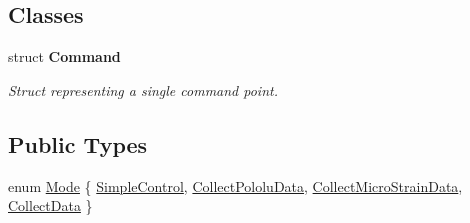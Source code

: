 \subsection*{\-Classes}
\begin{DoxyCompactItemize}
\item 
struct {\bfseries \-Command}
\begin{DoxyCompactList}\small\item\em \-Struct representing a single command point. \end{DoxyCompactList}\end{DoxyCompactItemize}
\subsection*{\-Public \-Types}
\begin{DoxyCompactItemize}
\item 
enum \hyperlink{class_u_s_u_1_1_kalman_filter_ab42b5998c23e20c32775873af96ce8c8}{\-Mode} \{ \hyperlink{class_u_s_u_1_1_kalman_filter_ab42b5998c23e20c32775873af96ce8c8abf30e92c798cd7c2a677f0dff63f8ea7}{\-Simple\-Control}, 
\hyperlink{class_u_s_u_1_1_kalman_filter_ab42b5998c23e20c32775873af96ce8c8ae435c722d55e7dda8c82b0b5ce18f136}{\-Collect\-Pololu\-Data}, 
\hyperlink{class_u_s_u_1_1_kalman_filter_ab42b5998c23e20c32775873af96ce8c8ae0a390c1eda0d057ba99b763bd863970}{\-Collect\-Micro\-Strain\-Data}, 
\hyperlink{class_u_s_u_1_1_kalman_filter_ab42b5998c23e20c32775873af96ce8c8a9d4c5f2021aefa7d0529670652be7a1a}{\-Collect\-Data}
 \}
\end{DoxyCompactItemize}
